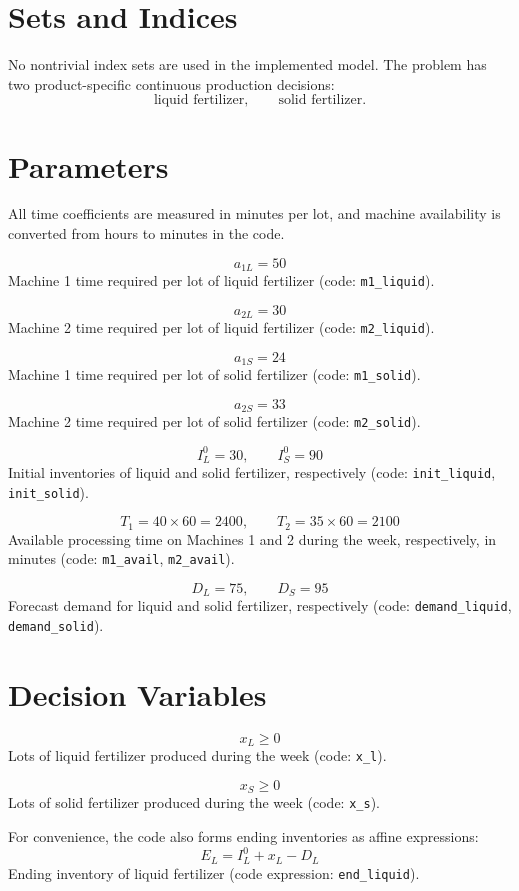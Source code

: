 \section*{Sets and Indices}

No nontrivial index sets are used in the implemented model. The problem has two product-specific continuous production decisions:
\[
\text{liquid fertilizer}, \qquad \text{solid fertilizer}.
\]

\section*{Parameters}

All time coefficients are measured in minutes per lot, and machine availability is converted from hours to minutes in the code.

\[
a_{1L} = 50
\]
Machine 1 time required per lot of liquid fertilizer (code: \texttt{m1\_liquid}).

\[
a_{2L} = 30
\]
Machine 2 time required per lot of liquid fertilizer (code: \texttt{m2\_liquid}).

\[
a_{1S} = 24
\]
Machine 1 time required per lot of solid fertilizer (code: \texttt{m1\_solid}).

\[
a_{2S} = 33
\]
Machine 2 time required per lot of solid fertilizer (code: \texttt{m2\_solid}).

\[
I_L^0 = 30, \qquad I_S^0 = 90
\]
Initial inventories of liquid and solid fertilizer, respectively (code: \texttt{init\_liquid}, \texttt{init\_solid}).

\[
T_1 = 40 \times 60 = 2400, \qquad T_2 = 35 \times 60 = 2100
\]
Available processing time on Machines 1 and 2 during the week, respectively, in minutes (code: \texttt{m1\_avail}, \texttt{m2\_avail}).

\[
D_L = 75, \qquad D_S = 95
\]
Forecast demand for liquid and solid fertilizer, respectively (code: \texttt{demand\_liquid}, \texttt{demand\_solid}).

\section*{Decision Variables}

\[
x_L \ge 0
\]
Lots of liquid fertilizer produced during the week (code: \texttt{x\_l}).

\[
x_S \ge 0
\]
Lots of solid fertilizer produced during the week (code: \texttt{x\_s}).

For convenience, the code also forms ending inventories as affine expressions:
\[
E_L = I_L^0 + x_L - D_L
\]
Ending inventory of liquid fertilizer (code expression: \texttt{end\_liquid}).

